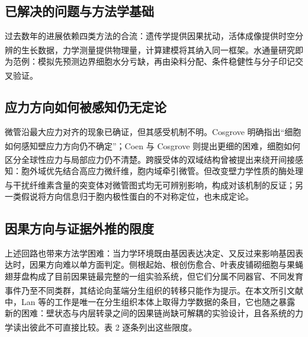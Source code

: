 \documentclass[11pt,a4paper]{ctexart}
\begin{document}
\subsection{已解决的问题与方法学基础}

过去数年的进展依赖四类方法的合流：遗传学提供因果扰动，活体成像提供时空分辨的生长数据，力学测量提供物理量，计算建模将其纳入同一框架\textsuperscript{\cite{ref3}}。水通量研究即为范例：模拟先预测边界细胞水分亏缺，再由染料分配、条件稳健性与分子印记交叉验证\textsuperscript{\cite{ref11}}。

\subsection{应力方向如何被感知仍无定论}

微管沿最大应力对齐的现象已确证，但其感受机制不明。Cosgrove 明确指出“细胞如何感知壁应力方向仍不确定”\textsuperscript{\cite{ref4}}；Coen 与 Cosgrove 则提出更细的困难，细胞如何区分全球性应力与局部应力仍不清楚\textsuperscript{\cite{ref3}}。跨膜受体的双域结构曾被提出来绕开间接感知：胞外域优先结合高应力微纤维，胞内域牵引微管。但改变壁力学性质的酶处理与干扰纤维素含量的突变体对微管图式均无可辨别影响，构成对该机制的反证\textsuperscript{\cite{ref3}}；另一类假说将方向信息归于胞内极性蛋白的不对称定位，也未成定论。

\subsection{因果方向与证据外推的限度}

上述回路也带来方法学困难：当力学环境既由基因表达决定、又反过来影响基因表达时，因果方向难以单方面判定。侧根起始、根创伤愈合、叶表皮铺砌细胞与果蝇翅芽盘构成了目前因果链最完整的一组实验系统，但它们分属不同器官、不同发育事件乃至不同类群，其结论向茎端分生组织的转移只能作为提示\textsuperscript{\cite{ref15,ref17,ref14,ref18}}。在本文所引文献中，Lan 等的工作是唯一在分生组织本体上取得力学数据的条目，它也随之暴露新的困难：壁状态与内层转录之间的因果链尚缺可解耦的实验设计，且各系统的力学读出彼此不可直接比较\textsuperscript{\cite{ref16}}。表 2 逐条列出这些限度。
\end{document}
